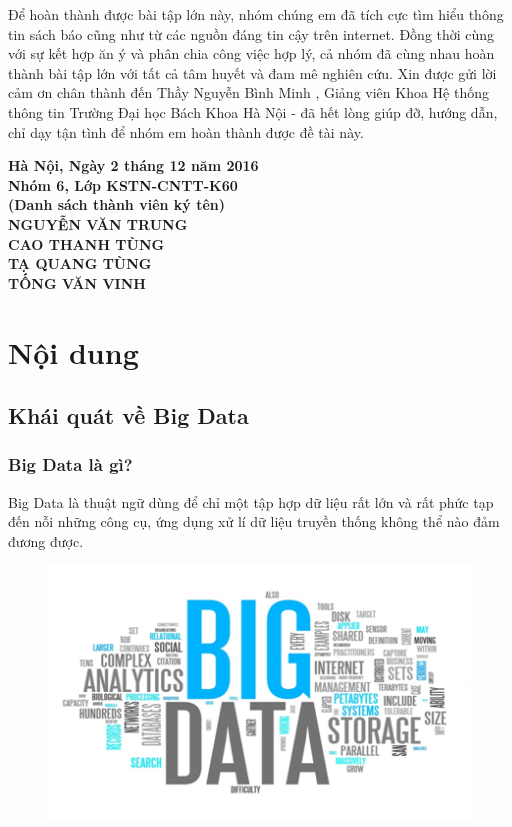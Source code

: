 \documentclass[12pt]{report}
\begin{document}
Để hoàn thành được bài tập lớn này, nhóm chúng em đã tích cực tìm hiểu thông tin sách báo cũng như  từ các nguồn đáng tin cậy trên internet. Đồng thời cùng với sự kết hợp ăn ý và phân chia công việc hợp lý, cả nhóm đã cùng nhau hoàn thành bài tập lớn với tất cả tâm huyết và đam mê nghiên cứu. Xin được gửi lời cảm ơn chân thành đến Thầy Nguyễn Bình Minh , Giảng viên Khoa Hệ thống thông tin Trường Đại học Bách Khoa Hà Nội - đã hết lòng giúp đỡ, hướng dẫn, chỉ dạy tận tình để nhóm em hoàn thành được đề tài này.
\newpage
\begin{flushright}
\bfseries
Hà Nội, Ngày 2 tháng 12 năm 2016 \\
\vspace{0.5cm}
Nhóm 6, Lớp KSTN-CNTT-K60 \\
(Danh sách thành viên ký tên) \\
\vspace{4mm}
NGUYỄN VĂN TRUNG \\
\vspace{13mm}
CAO THANH TÙNG \\
\vspace{13mm}
TẠ QUANG TÙNG \\
\vspace{13mm}
TỐNG VĂN VINH
\newpage

\end{flushright}

\chapter*{Nội dung}
\section{Khái quát về Big Data}
\subsection{Big Data là gì?}

Big Data là thuật ngữ dùng để chỉ một tập hợp dữ liệu rất lớn và rất phức tạp đến nỗi những công cụ, ứng dụng xử lí dữ liệu truyền thống không thể nào đảm đương được. \cite{definition}

\begin{figure}[H]
\centering
\includegraphics[scale=1]{big_data.png}
\end{figure}
\end{document}
